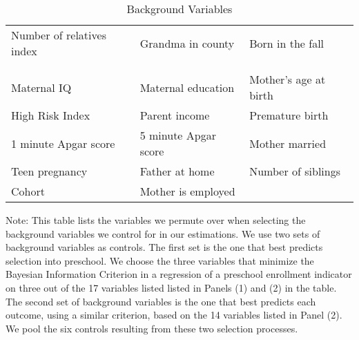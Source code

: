 \begin{table}[H]
\centering
\begin{threeparttable}
\caption{Background Variables}
\label{tab:pselectvars}
\begin{tabular}{C{5cm} C{5cm} C{5cm}}
\toprule
{} \\
\midrule
Number of relatives index	& Grandma in county	& Born in the fall \\\\
\midrule
{} \\
\midrule
Maternal IQ			& Maternal education		& Mother's age at birth \\
High Risk Index		& Parent income			& Premature birth \\
1 minute Apgar score	& 5 minute Apgar score	& Mother married \\
Teen pregnancy		& Father at home			& Number of siblings \\
Cohort 				& Mother is employed		& \\
\bottomrule
\end{tabular}
\begin{tablenotes}
\footnotesize
\item Note: This table lists the variables we permute over when selecting the background variables we control for in our estimations. We use two sets of background variables as controls. The first set is the one that best predicts selection into preschool. We choose the three variables that minimize the Bayesian Information Criterion in a regression of a preschool enrollment indicator on three out of the 17 variables listed listed in Panels (1) and (2) in the table. The second set of background variables is the one that best predicts each outcome, using a similar criterion, based on the 14 variables listed in Panel (2). We pool the six controls resulting from these two selection processes.
\end{tablenotes}
\end{threeparttable}
\end{table}